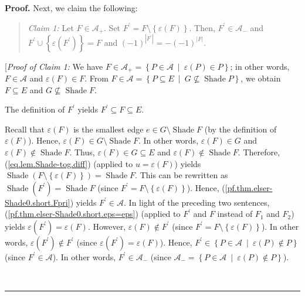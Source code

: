 \documentclass[numbers=enddot,12pt,final,onecolumn]{scrartcl}%
\theoremstyle{definition}
\newenvironment{statement}{\begin{quote}}{\end{quote}}
\newenvironment{proof}[1][Proof]{\noindent\textbf{#1.} }{\ \rule{0.5em}{0.5em}}
\newenvironment{vershort}{}{}
\begin{document}
\begin{vershort}
\begin{proof}
Next, we claim the following:

\begin{statement}
\textit{Claim 1:} Let $F\in\mathcal{A}_{+}$. Set $F^{\prime}=F\setminus
\left\{  \varepsilon\left(  F\right)  \right\}  $. Then, $F^{\prime}%
\in\mathcal{A}_{-}$ and $F^{\prime}\cup\left\{  \varepsilon\left(  F^{\prime
}\right)  \right\}  =F$ and $\left(  -1\right)  ^{\left\vert F^{\prime
}\right\vert }=-\left(  -1\right)  ^{\left\vert F\right\vert }$.
\end{statement}

[\textit{Proof of Claim 1:} We have $F\in\mathcal{A}_{+}=\left\{
P\in\mathcal{A}\ \mid\ \varepsilon\left(  P\right)  \in P\right\}  $; in other
words, $F\in\mathcal{A}$ and $\varepsilon\left(  F\right)  \in F$. From
$F\in\mathcal{A}=\left\{  P\subseteq E\ \mid\ G\not \subseteq
\operatorname*{Shade}P\right\}  $, we obtain $F\subseteq E$ and
$G\not \subseteq \operatorname*{Shade}F$.

The definition of $F^{\prime}$ yields $F^{\prime}\subseteq F\subseteq E$.

Recall that $\varepsilon\left(  F\right)  $ is the smallest edge $e\in
G\setminus\operatorname*{Shade}F$ (by the definition of $\varepsilon\left(
F\right)  $). Hence, $\varepsilon\left(  F\right)  \in G\setminus
\operatorname*{Shade}F$. In other words, $\varepsilon\left(  F\right)  \in G$
and $\varepsilon\left(  F\right)  \notin\operatorname*{Shade}F$. Thus,
$\varepsilon\left(  F\right)  \in G\subseteq E$ and $\varepsilon\left(
F\right)  \notin\operatorname*{Shade}F$. Therefore,
(\ref{eq.lem.Shade-tog.diff}) (applied to $u=\varepsilon\left(  F\right)  $)
yields $\operatorname*{Shade}\left(  F\setminus\left\{  \varepsilon\left(
F\right)  \right\}  \right)  =\operatorname*{Shade}F$. This can be rewritten
as $\operatorname*{Shade}\left(  F^{\prime}\right)  =\operatorname*{Shade}F$
(since $F^{\prime}=F\setminus\left\{  \varepsilon\left(  F\right)  \right\}
$). Hence, (\ref{pf.thm.elser-Shade0.short.Fpri}) yields $F^{\prime}%
\in\mathcal{A}$. In light of the preceding two sentences,
(\ref{pf.thm.elser-Shade0.short.eps=eps}) (applied to $F^{\prime}$ and $F$
instead of $F_{1}$ and $F_{2}$) yields $\varepsilon\left(  F^{\prime}\right)
=\varepsilon\left(  F\right)  $. However, $\varepsilon\left(  F\right)  \notin
F^{\prime}$ (since $F^{\prime}=F\setminus\left\{  \varepsilon\left(  F\right)
\right\}  $). In other words, $\varepsilon\left(  F^{\prime}\right)  \notin
F^{\prime}$ (since $\varepsilon\left(  F^{\prime}\right)  =\varepsilon\left(
F\right)  $). Hence, $F^{\prime}\in\left\{  P\in\mathcal{A}\ \mid
\ \varepsilon\left(  P\right)  \notin P\right\}  $ (since $F^{\prime}%
\in\mathcal{A}$). In other words, $F^{\prime}\in\mathcal{A}_{-}$ (since
$\mathcal{A}_{-}=\left\{  P\in\mathcal{A}\ \mid\ \varepsilon\left(  P\right)
\notin P\right\}  $).


\end{proof}
\end{vershort}
\end{document}
